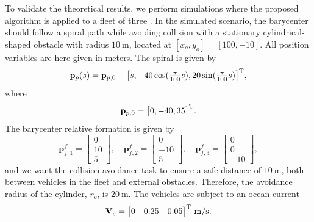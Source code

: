 To validate the theoretical results, we perform simulations where the proposed algorithm is applied to a fleet of three  \cite{sousa_LAUV_2012}. In the simulated scenario, the barycenter should follow a spiral path while avoiding collision with a stationary cylindrical-shaped obstacle with radius $\SI{10}{\meter}$, located at $[x_o,y_o] = [100,-10]$. All position variables are here given in meters. The spiral is given by
\begin{equation}
    \mathbf{p}_p(s) = \mathbf{p}_{p,0} + \bigl[s, -40 \cos(\tfrac{\pi}{100} s), 20 \sin(\tfrac{\pi}{100} s)\bigr]^{\mathrm{T}},
\end{equation}
where \begin{equation}
    \mathbf{p}_{p,0} = \bigl[ 0, -40, 35 \bigr]^{\mathrm{T}}.
\end{equation}
The barycenter relative formation is given by
\begin{equation}
    \mathbf{p}_{f,1}^f = \begin{bmatrix}0 \\ 10 \\ 5\end{bmatrix}, \quad \mathbf{p}_{f,2}^f = \begin{bmatrix}0 \\ -10 \\ 5\end{bmatrix},\quad \mathbf{p}_{f,3}^f = \begin{bmatrix}0 \\ 0 \\ -10\end{bmatrix},
\end{equation}
and we want the collision avoidance task to ensure a safe distance of $\SI{10}{\meter}$, both between vehicles in the fleet and external obstacles. Therefore, the avoidance radius of the cylinder, $r_o$, is $\SI{20}{\meter}$. The vehicles are subject to an ocean current 
\begin{equation}
    \mathbf{V}_c = \begin{bmatrix}
        0 & 0.25 & 0.05
    \end{bmatrix}^{\mathrm{T}} \,\mathrm{m/s}.
\end{equation}

